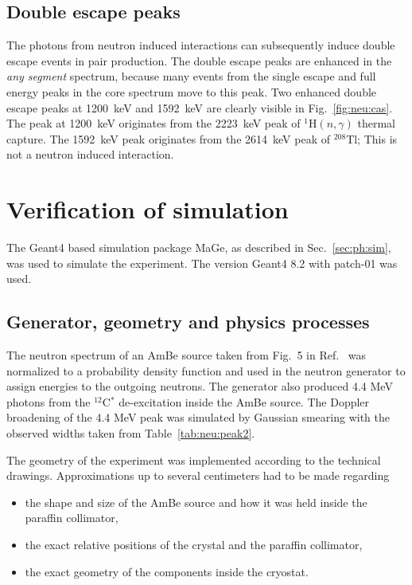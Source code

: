 \subsection{Double escape peaks}
\label{sec:neu:dep}
The photons from neutron induced interactions can subsequently induce
double escape events in pair production. The double escape peaks are
enhanced in the \emph{any segment} spectrum, because many events from
the single escape and full energy peaks in the core spectrum move to
this peak. Two enhanced double escape peaks at 1200~keV and 1592~keV
are clearly visible in Fig.~\ref{fig:neu:cas}. The peak at 1200~keV
originates from the 2223~keV peak of $^{1}$H$(n,\gamma)$ thermal
capture. The 1592~keV peak originates from the 2614~keV peak of
$^{208}$Tl; This is not a neutron induced interaction.


\section{Verification of simulation}
\label{sec:neu:sim}
The Geant4 \cite{Gea03, Gea06} based simulation package MaGe, as
described in Sec.~\ref{sec:ph:sim}, was used to simulate the
experiment. The version Geant4 8.2 with patch-01 was used.

\subsection{Generator, geometry and physics processes}
\label{sec:simdetail}
The neutron spectrum of an AmBe source taken from Fig.~5 in
Ref.~\cite{Mar95} was normalized to a probability density function and
used in the neutron generator to assign energies to the outgoing
neutrons. The generator also produced 4.4 MeV photons from the
$^{12}$C$^{*}$ de-excitation inside the AmBe source. The Doppler
broadening of the 4.4 MeV peak was simulated by Gaussian smearing with
the observed widths taken from Table~\ref{tab:neu:peak2}.

The geometry of the experiment was implemented according to the
technical drawings. Approximations up to several centimeters had to be
made regarding
\begin{itemize}
\item the shape and size of the AmBe source and how it was held inside
the paraffin collimator,
\item the exact relative positions of the crystal and the paraffin
collimator,
\item the exact geometry of the components inside the cryostat.
\end{itemize}

